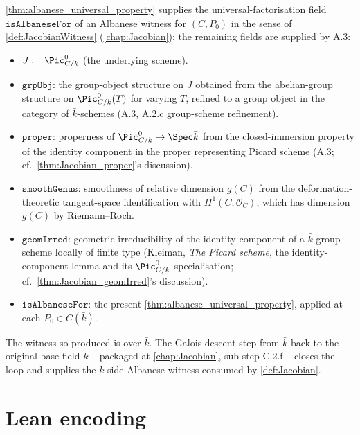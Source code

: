 \cref{thm:albanese_universal_property} supplies the universal-factorisation
field \(\texttt{isAlbaneseFor}\) of an Albanese witness for \((C, P_0)\) in the
sense of \cref{def:JacobianWitness} (\cref{chap:Jacobian}); the remaining
fields are supplied by A.3:
\begin{itemize}
  \item \(J := \Pic^0_{C/k}\) (the underlying scheme).
  \item \(\texttt{grpObj}\): the group-object structure on \(J\) obtained from the
    abelian-group structure on \(\Pic^0_{C/k}(T)\) for varying \(T\), refined to a
    group object in the category of \(\bar k\)-schemes (A.3, A.2.c group-scheme
    refinement).
  \item \(\texttt{proper}\): properness of \(\Pic^0_{C/k} \to \Spec \bar k\) from
    the closed-immersion property of the identity component in the proper
    representing Picard scheme (A.3; cf.\
    \cref{thm:Jacobian_proper}'s discussion).
  \item \(\texttt{smoothGenus}\): smoothness of relative dimension \(g(C)\) from
    the deformation-theoretic tangent-space identification with \(H^1(C,
    \mathcal O_C)\), which has dimension \(g(C)\) by Riemann--Roch.
  \item \(\texttt{geomIrred}\): geometric irreducibility of the identity
    component of a \(\bar k\)-group scheme locally of finite type (Kleiman,
    \emph{The Picard scheme}, the identity-component lemma and its
    \(\Pic^0_{C/k}\) specialisation; cf.\
    \cref{thm:Jacobian_geomIrred}'s discussion).
  \item \(\texttt{isAlbaneseFor}\): the present
    \cref{thm:albanese_universal_property}, applied at each
    \(P_0 \in C(\bar k)\).
\end{itemize}

The witness so produced is over \(\bar k\). The Galois-descent step from \(\bar
k\) back to the original base field \(k\) -- packaged at
\cref{chap:Jacobian}, sub-step C.2.f -- closes the loop and supplies the
\(k\)-side Albanese witness consumed by \cref{def:Jacobian}.

\section{Lean encoding}
\label{sec:albaneseup_lean_encoding}

